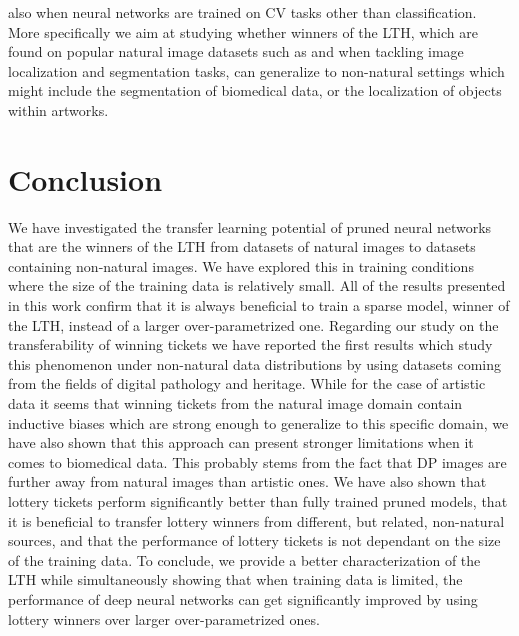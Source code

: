 also when neural networks are trained on CV tasks other than classification. More specifically we aim at studying whether winners of the LTH, which are found on popular natural image datasets such as \cite{lin2014microsoft} and \cite{everingham2010pascal} when tackling image localization and segmentation tasks, can generalize to non-natural settings which might include the segmentation of biomedical data, or the localization of objects within artworks.

\section{Conclusion}
\label{sec:conclusion}
We have investigated the transfer learning potential of pruned neural networks that are the winners of the LTH from datasets of natural images to datasets containing non-natural images. We have explored this in training conditions where the size of the training data is relatively small. All of the results presented in this work confirm that it is always beneficial to train a sparse model, winner of the LTH, instead of a larger over-parametrized one. Regarding our study on the transferability of winning tickets we have reported the first results which study this phenomenon under non-natural data distributions by using datasets coming from the fields of digital pathology and heritage. While for the case of artistic data it seems that winning tickets from the natural image domain contain inductive biases which are strong enough to generalize to this specific domain, we have also shown that this approach can present stronger limitations when it comes to biomedical data. This probably stems from the fact that DP images are further away from natural images than artistic ones. We have also shown that lottery tickets perform significantly better than fully trained pruned models, that it is beneficial to transfer lottery winners from different, but related, non-natural sources, and that the performance of lottery tickets is not dependant on the size of the training data. To conclude, we provide a better characterization of the LTH while simultaneously showing that when training data is limited, the performance of deep neural networks can get significantly improved by using lottery winners over larger over-parametrized ones.
